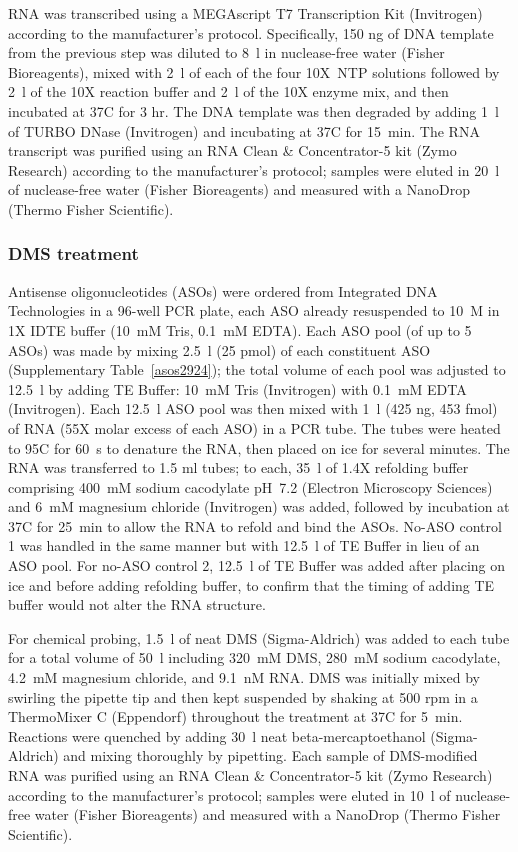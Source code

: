 \documentclass[main.tex]{subfiles}
\begin{document}
RNA was transcribed using a MEGAscript T7 Transcription Kit (Invitrogen) according to the manufacturer's protocol.
Specifically, 150 ng of DNA template from the previous step was diluted to 8~\textmu l in nuclease-free water (Fisher Bioreagents), mixed with 2~\textmu l of each of the four 10X~NTP solutions followed by 2~\textmu l of the 10X reaction buffer and 2~\textmu l of the 10X enzyme mix, and then incubated at 37\textdegree C for 3 hr.
The DNA template was then degraded by adding 1~\textmu l of TURBO DNase (Invitrogen) and incubating at 37\textdegree C for 15~min.
The RNA transcript was purified using an RNA Clean \& Concentrator-5 kit (Zymo Research) according to the manufacturer's protocol; samples were eluted in 20~\textmu l of nuclease-free water (Fisher Bioreagents) and measured with a NanoDrop (Thermo Fisher Scientific).

\subsubsection{DMS treatment}

Antisense oligonucleotides (ASOs) were ordered from Integrated DNA Technologies in a 96-well PCR plate, each ASO already resuspended to 10~\textmu M in 1X IDTE buffer (10~mM Tris, 0.1~mM EDTA).
Each ASO pool (of up to 5 ASOs) was made by mixing 2.5~\textmu l (25 pmol) of each constituent ASO (Supplementary Table~\ref{asos2924}); the total volume of each pool was adjusted to 12.5~\textmu l by adding TE Buffer: 10~mM Tris (Invitrogen) with 0.1~mM EDTA (Invitrogen).
Each 12.5~\textmu l ASO pool was then mixed with 1~\textmu l (425 ng, 453 fmol) of RNA (55X molar excess of each ASO) in a PCR tube.
The tubes were heated to 95\textdegree C for 60~s to denature the RNA, then placed on ice for several minutes.
The RNA was transferred to 1.5 ml tubes; to each, 35~\textmu l of 1.4X refolding buffer comprising 400~mM sodium cacodylate pH~7.2 (Electron Microscopy Sciences) and 6~mM magnesium chloride (Invitrogen) was added, followed by incubation at 37\textdegree C for 25~min to allow the RNA to refold and bind the ASOs.
No-ASO control 1 was handled in the same manner but with 12.5~\textmu l of TE Buffer in lieu of an ASO pool.
For no-ASO control 2, 12.5~\textmu l of TE Buffer was added after placing on ice and before adding refolding buffer, to confirm that the timing of adding TE buffer would not alter the RNA structure.

For chemical probing, 1.5~\textmu l of neat DMS (Sigma-Aldrich) was added to each tube for a total volume of 50~\textmu l including 320~mM DMS, 280~mM sodium cacodylate, 4.2~mM magnesium chloride, and 9.1~nM RNA.
DMS was initially mixed by swirling the pipette tip and then kept suspended by shaking at 500 rpm in a ThermoMixer C (Eppendorf) throughout the treatment at 37\textdegree C for 5~min.
Reactions were quenched by adding 30~\textmu l neat beta-mercaptoethanol (Sigma-Aldrich) and mixing thoroughly by pipetting.
Each sample of DMS-modified RNA was purified using an RNA Clean \& Concentrator-5 kit (Zymo Research) according to the manufacturer's protocol; samples were eluted in 10~\textmu l of nuclease-free water (Fisher Bioreagents) and measured with a NanoDrop (Thermo Fisher Scientific).
\end{document}
